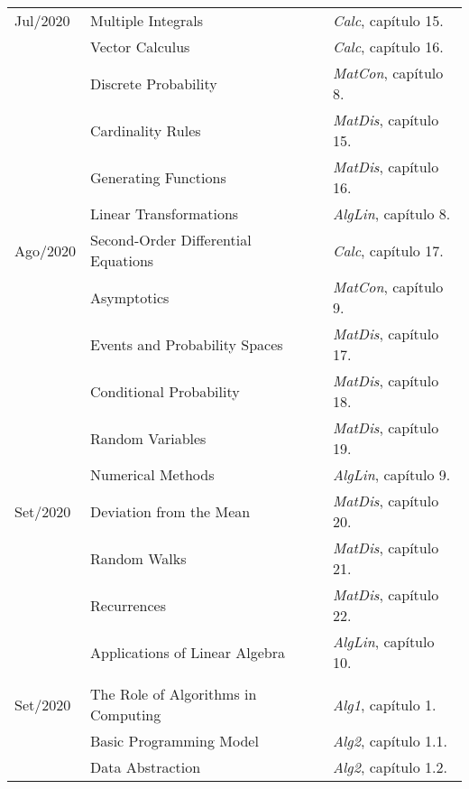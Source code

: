 \documentclass[a4paper]{inzane_syllabus} %
\begin{document}
\begin{center}
\begin{tabularx}{\textwidth}{p{2cm}p{8cm}p{9.5cm}}
\arrayrulecolor{maingray}\hline
Jul/2020 & Multiple Integrals      & \emph{Calc},   capítulo 15. \\
         & Vector Calculus         & \emph{Calc},   capítulo 16. \\
         & Discrete Probability    & \emph{MatCon}, capítulo 8.  \\
         & Cardinality Rules       & \emph{MatDis}, capítulo 15. \\
         & Generating Functions    & \emph{MatDis}, capítulo 16. \\
         & Linear Transformations  & \emph{AlgLin}, capítulo 8.  \\

\arrayrulecolor{maingray}\hline
Ago/2020 & Second-Order Differential Equations  & \emph{Calc},   capítulo 17. \\
         & Asymptotics                          & \emph{MatCon}, capítulo 9.  \\
         & Events and Probability Spaces        & \emph{MatDis}, capítulo 17. \\
         & Conditional Probability              & \emph{MatDis}, capítulo 18. \\
         & Random Variables                     & \emph{MatDis}, capítulo 19. \\
         & Numerical Methods                    & \emph{AlgLin}, capítulo 9.  \\

\arrayrulecolor{maingray}\hline
Set/2020 & Deviation from the Mean         & \emph{MatDis}, capítulo 20. \\
         & Random Walks                    & \emph{MatDis}, capítulo 21. \\
         & Recurrences                     & \emph{MatDis}, capítulo 22. \\
         & Applications of Linear Algebra  & \emph{AlgLin}, capítulo 10. \\


\arrayrulecolor{myCOLOR}\hline
\multicolumn{2}{l}{\textbf{\textcolor{myCOLOR}{\large MÓDULO 2: FUNDAMENTOS DA COMPUTAÇÃO }}} \\
\hline
Set/2020 & The Role of Algorithms in Computing  & \emph{Alg1}, capítulo 1.   \\
         & Basic Programming Model              & \emph{Alg2}, capítulo 1.1. \\
         & Data Abstraction                     & \emph{Alg2}, capítulo 1.2. \\


\end{tabularx}
\end{center}
\end{document}
